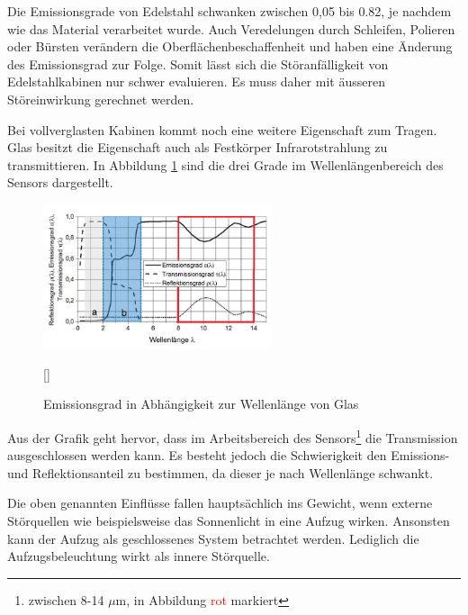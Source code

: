 Die Emissionsgrade von Edelstahl schwanken zwischen 0,05 bis 0.82, je nachdem wie das Material verarbeitet wurde. Auch Veredelungen durch Schleifen, Polieren oder Bürsten verändern die Oberflächenbeschaffenheit und haben eine Änderung des Emissionsgrad zur Folge. Somit lässt sich die Störanfälligkeit von Edelstahlkabinen nur schwer evaluieren. Es muss daher mit äusseren Störeinwirkung gerechnet werden. 

Bei vollverglasten Kabinen kommt noch eine weitere Eigenschaft zum Tragen. Glas besitzt die Eigenschaft auch als Festkörper Infrarotstrahlung zu transmittieren. In Abbildung \ref{fig:Glas} sind die drei Grade im  Wellenlängenbereich des Sensors dargestellt. 

\begin{figure}[H]
	\centering
	\includegraphics[width=0.6\textwidth]
	{fig/Glas_bearbeitet.png}
	\caption[Emissionsgrad in Abhängikeit zur Wellenlnge]{Emissionsgrad in Abhängigkeit zur Wellenlänge von Glas}[\cite{Glas}] 
	\label{fig:Glas}	
\end{figure}

Aus der Grafik geht hervor, dass im Arbeitsbereich des Sensors\footnote[10]{zwischen 8-14 $\mu$m, in Abbildung \textcolor{red}{rot } markiert} die Transmission ausgeschlossen werden kann. Es besteht jedoch die Schwierigkeit den Emissions- und Reflektionsanteil zu bestimmen, da dieser je nach Wellenlänge schwankt.

Die oben genannten Einflüsse fallen hauptsächlich ins Gewicht, wenn externe Störquellen wie beispielsweise das Sonnenlicht in eine Aufzug wirken. Ansonsten kann der Aufzug als geschlossenes System betrachtet werden. Lediglich die Aufzugsbeleuchtung wirkt als innere Störquelle.

